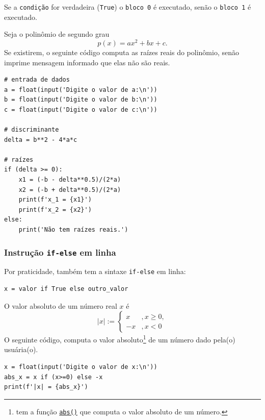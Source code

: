 Se a {\lstinline+condição+} for verdadeira ({\lstinline+True+}) o {\lstinline+bloco 0+} é executado, senão o {\lstinline+bloco 1+} é executado.

\begin{ex}
  Seja o polinômio de segundo grau
  \begin{equation}
    p(x) = ax^2 + bx + c.
  \end{equation}
  Se existirem, o seguinte código computa as raízes reais do polinômio, senão imprime mensagem informado que elas não são reais.
\begin{lstlisting}
# entrada de dados
a = float(input('Digite o valor de a:\n'))
b = float(input('Digite o valor de b:\n'))
c = float(input('Digite o valor de c:\n'))

# discriminante
delta = b**2 - 4*a*c

# raízes
if (delta >= 0):
    x1 = (-b - delta**0.5)/(2*a)
    x2 = (-b + delta**0.5)/(2*a)
    print(f'x_1 = {x1}')
    print(f'x_2 = {x2}')
else:
    print('Não tem raízes reais.')
\end{lstlisting}
\end{ex}

\subsubsection{Instrução \lstinline+if-else+ em linha}

Por praticidade, {\python} também tem a sintaxe \lstinline+if-else+ em linha:
\begin{lstlisting}
x = valor if True else outro_valor
\end{lstlisting}

\begin{ex}
  O valor absoluto de um número real $x$ é
  \begin{equation}
    |x| := \left\{
      \begin{array}{ll}
        x &, x\geq 0,\\
        -x &, x<0
      \end{array}
    \right.
  \end{equation}
  O seguinte código, computa o valor absoluto\footnote{{\python} tem a função \href{https://docs.python.org/3/library/functions.html\#abs}{\lstinline+abs()+} que computa o valor absoluto de um número.} de um número dado pela(o) usuária(o).
\begin{lstlisting}
x = float(input('Digite o valor de x:\n'))
abs_x = x if (x>=0) else -x
print(f'|x| = {abs_x}')
\end{lstlisting}
\end{ex}


